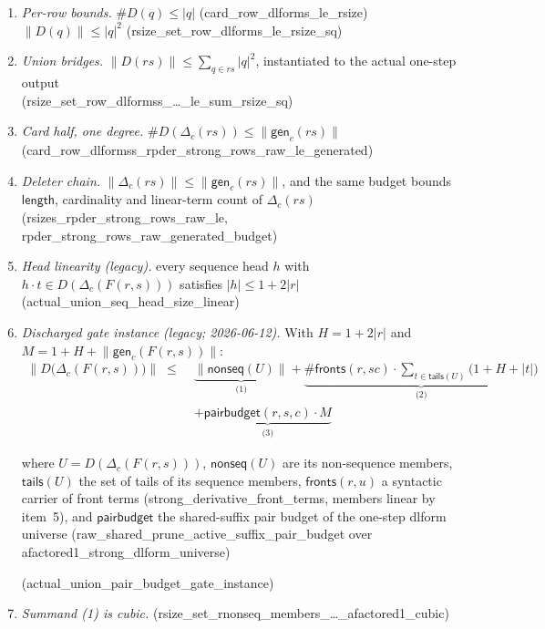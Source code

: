 \documentclass[11pt]{article}
\theoremstyle{remark}
\newcommand{\rs}[1]{\lvert #1\rvert}                 %
\newcommand{\rss}[1]{\lVert #1\rVert}                %
\newcommand{\rssb}[1]{\bigl\lVert #1\bigr\rVert}      %
\newcommand{\Fact}{F}
\newcommand{\Dstep}{\Delta}
\newcommand{\open}{D}
\newcommand{\gen}{\mathsf{gen}}
\newcommand{\fronts}{\mathsf{fronts}}
\newcommand{\tails}{\mathsf{tails}}
\newcommand{\nonseq}{\mathsf{nonseq}}
\newcommand{\pb}{\mathsf{pairbudget}}
\newcommand{\thy}[1]{\textsf{\small #1}}
\begin{document}
\begin{enumerate}
\item \emph{Per-row bounds.}\;
$\#\open(q)\le\rs{q}$ \hfill(\thy{card\_row\_dlforms\_le\_rsize})\\
$\rss{\open(q)}\le\rs{q}^{2}$ \hfill(\thy{rsize\_set\_row\_dlforms\_le\_rsize\_sq})
\item \emph{Union bridges.}\;
$\rss{\open(rs)}\le\sum_{q\in rs}\rs{q}^{2}$, instantiated to the actual
one-step output\\
\mbox{}\hfill(\thy{rsize\_set\_row\_dlformss\_\dots\_le\_sum\_rsize\_sq})
\item \emph{Card half, one degree.}\;
$\#\open(\Dstep_c(rs))\le\rss{\gen_c(rs)}$\\
\mbox{}\hfill(\thy{card\_row\_dlformss\_rpder\_strong\_rows\_raw\_le\_generated})
\item \emph{Deleter chain.}\;
$\rss{\Dstep_c(rs)}\le\rss{\gen_c(rs)}$, and the same budget bounds
$\mathsf{length}$, cardinality and linear-term count of $\Dstep_c(rs)$
\hfill(\thy{rsizes\_rpder\_strong\_rows\_raw\_le},
\thy{rpder\_strong\_rows\_raw\_generated\_budget})
\item \emph{Head linearity (legacy).}\; every sequence head $h$ with
$h\cdot t\in\open(\Dstep_c(\Fact(r,s)))$ satisfies $\rs{h}\le 1+2\rs{r}$
\hfill(\thy{actual\_union\_seq\_head\_size\_linear})
\item \emph{Discharged gate instance (legacy; 2026-06-12).}  With
$H=1+2\rs{r}$ and $M=1+H+\rss{\gen_c(\Fact(r,s))}$:
\[
\begin{aligned}
\rssb{\open\bigl(\Dstep_c(\Fact(r,s))\bigr)}\;\le\;
&\underbrace{\rssb{\nonseq(U)}}_{\text{(1)}}
+\underbrace{\#\fronts(r,s c)\cdot{\textstyle\sum_{t\in\tails(U)}}
   \bigl(1{+}H{+}\rs{t}\bigr)}_{\text{(2)}}\\[2pt]
&+\underbrace{\pb(r,s,c)\cdot M}_{\text{(3)}}
\end{aligned}
\]
{\sloppy
where $U=\open(\Dstep_c(\Fact(r,s)))$, $\nonseq(U)$ are its non-sequence
members, $\tails(U)$ the set of tails of its sequence members,
$\fronts(r,u)$ a syntactic carrier of front terms
(\thy{strong\_derivative\_front\_terms}, members linear by item~5), and
$\pb$ the shared-suffix pair budget of the one-step dlform universe
(\thy{raw\_shared\_prune\_active\_suffix\_pair\_budget} over
\thy{afactored1\_strong\_dlform\_universe})\par}
\mbox{}\hfill(\thy{actual\_union\_pair\_budget\_gate\_instance})
\item \emph{Summand (1) is cubic.} \hfill
(\thy{rsize\_set\_rnonseq\_members\_\dots\_afactored1\_cubic})

\end{enumerate}
\end{document}
